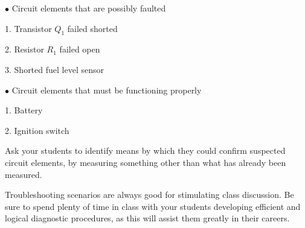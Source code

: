 \medskip
\goodbreak
\item{$\bullet$} Circuit elements that are possibly faulted
\item{1.} Transistor $Q_1$ failed shorted
\item{2.} Resistor $R_1$ failed open
\item{3.} Shorted fuel level sensor
\medskip

\medskip
\goodbreak
\item{$\bullet$} Circuit elements that must be functioning properly
\item{1.} Battery
\item{2.} Ignition switch
\medskip







Ask your students to identify means by which they could confirm suspected circuit elements, by measuring something other than what has already been measured.

Troubleshooting scenarios are always good for stimulating class discussion.  Be sure to spend plenty of time in class with your students developing efficient and logical diagnostic procedures, as this will assist them greatly in their careers.




